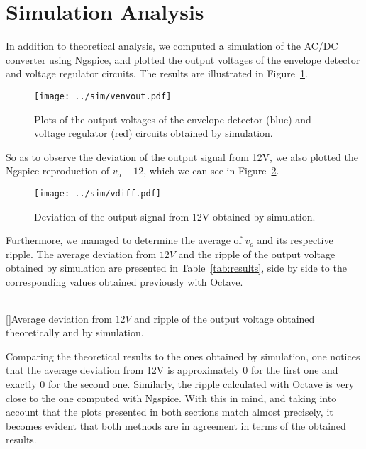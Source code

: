 \section{Simulation Analysis}
\label{sec:simulation}

In addition to theoretical analysis, we computed a simulation of the AC/DC converter using Ngspice, and plotted the output voltages of the envelope detector and voltage regulator circuits. The results are illustrated in Figure~\ref{fig:venvout}.

\vspace{-30mm}

\begin{figure}[H] \centering
\texttt{[image: ../sim/venvout.pdf]}
\caption{Plots of the output voltages of the envelope detector (blue) and voltage regulator (red) circuits obtained by simulation.}
\label{fig:venvout}
\end{figure}

So as to observe the deviation of the output signal from 12V, we also plotted the Ngspice reproduction of $v_o-12$, which we can see in Figure~\ref{fig:vdiff}.

\vspace{-20mm}

\begin{figure}[H] \centering
\texttt{[image: ../sim/vdiff.pdf]}
\caption{Deviation of the output signal from 12V obtained by simulation.}
\label{fig:vdiff}
\end{figure}

Furthermore, we managed to determine the average of $v_o$ and its respective ripple. The average deviation from $12V$ and the ripple of the output voltage obtained by simulation are presented in Table~\ref{tab:results}, side by side to the corresponding values obtained previously with Octave.

\vspace{2mm}

\begin{center}
\begin{tabular}{ | c | c | c | }\hline
 
\end{tabular}
[]{Average deviation from $12V$ and ripple of the output voltage obtained theoretically and by simulation.}
\label{tab:results}
\end{center}

\vspace{2mm}

Comparing the theoretical results to the ones obtained by simulation, one notices that the average deviation from 12V is approximately 0 for the first one and exactly 0 for the second one. Similarly, the ripple calculated with Octave is very close to the one computed with Ngspice. With this in mind, and taking into account that the plots presented in both sections match almost precisely, it becomes evident that both methods are in agreement in terms of the obtained results.\\

